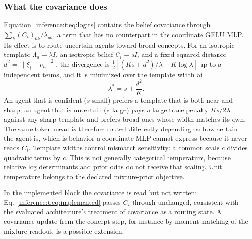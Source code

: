 \documentclass[11pt]{article}
\theoremstyle{definition}
\theoremstyle{remark}
\begin{document}
\subsubsection{What the covariance does}

Equation~\eqref{inference:t:eq:logits} contains the belief covariance through $\sum_k(C_i)_{kk}/\lambda_{ak}$, a term that has no counterpart in the coordinate GELU MLP. Its effect is to route uncertain agents toward broad concepts. For an isotropic template $\Lambda_a=\lambda I$, an isotropic belief $C_i=sI$, and a fixed squared distance $d^2=\|\xi_i-\nu_a\|^2$, the divergence is $\frac12[(Ks+d^2)/\lambda+K\log\lambda]$ up to $a$-independent terms, and it is minimized over the template width at
\begin{equation}
\lambda^{*}=s+\frac{d^2}{K}.
\end{equation}
An agent that is confident ($s$ small) prefers a template that is both near and sharp; an agent that is uncertain ($s$ large) pays a large trace penalty $Ks/2\lambda$ against any sharp template and prefers broad ones whose width matches its own. The same token mean is therefore routed differently depending on how certain the agent is, which is behavior a coordinate MLP cannot express because it never reads $C_i$. Template widths control mismatch sensitivity: a common scale $c$ divides quadratic terms by $c$. This is not generally categorical temperature, because relative log determinants and prior odds do not receive that scaling. Unit temperature belongs to the declared mixture-prior objective.

In the implemented block the covariance is read but not written: Eq.~\eqref{inference:t:eq:implemented} passes $C_i$ through unchanged, consistent with the evaluated architecture's treatment of covariance as a routing state. A covariance update from the concept step, for instance by moment matching of the mixture readout, is a possible extension.
\end{document}
